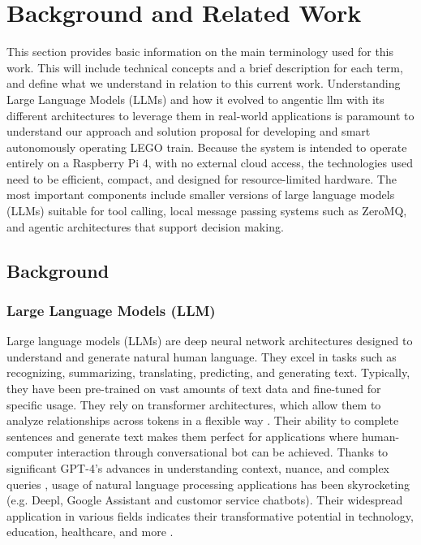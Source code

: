 \chapter{Background and Related Work}
\label{ch:background}

This section provides basic information on the main terminology used for this work. This will include technical concepts and a brief description for each term, and define what we understand in relation to this current work. Understanding Large Language Models (LLMs) and how it evolved to angentic llm with its different architectures to leverage them in real-world applications is paramount to understand our approach and solution proposal for developing and smart autonomously operating LEGO train.
Because the system is intended to operate entirely on a Raspberry Pi 4, with no external cloud access, the technologies used need to be efficient, compact, and designed for resource-limited hardware. The most important components include smaller versions of large language models (LLMs) suitable for tool calling, local message passing systems such as ZeroMQ, and agentic architectures that support decision making.

%
%

\section{Background} %
\label{sec:background:first_section}

\subsection{Large Language Models (LLM)}
\label{subsec:background:first_section:first_subsection}

Large language models (LLMs) are deep neural network architectures designed to understand and generate natural human language. They excel in tasks such as recognizing, summarizing, translating, predicting, and generating text. Typically, they have been pre-trained on vast amounts of text data and fine-tuned for specific usage. They rely on transformer architectures, which allow them to analyze relationships across tokens in a flexible way \cite{vaswani_attention_2023, brown_efficient_2023}. Their ability to complete sentences and generate text makes them perfect for applications where human-computer interaction through conversational bot can be achieved. Thanks to significant GPT-4's advances in understanding context, nuance, and complex queries \cite{mapletoft_attempt_2024, cao_automatic_2024}, usage of natural language processing applications has been skyrocketing (e.g. Deepl, Google Assistant and customor service chatbots). Their widespread application in various fields indicates their transformative potential in technology, education, healthcare, and more \cite{wang_survey_2024}.


